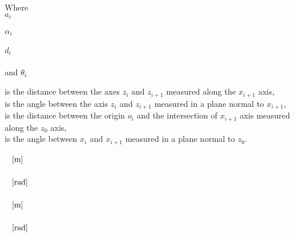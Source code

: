 \begin{minipage}[t]{0.20\textwidth}
Where\\
\hspace*{8mm} $a_i$ \\\\
\hspace*{8mm} $\alpha_i$ \\\\
\hspace*{8mm} $d_i$ \\\\
and \hspace*{0.7mm} $\theta_i$	
\end{minipage}
\begin{minipage}[t]{0.68\textwidth}
\vspace*{2mm}
is the distance between the axes $z_i$ and $z_{i+1}$ measured along the $x_{i+1}$ axis,\\
is the angle between the axis $z_i$ and $z_{i+1}$ measured in a plane normal to $x_{i+1}$,\\
is the distance between the origin $o_i$ and the intersection of $x_{i+1}$ axis measured along the $z_0$ axis,\\
is the angle between $x_i$ and $x_{i+1}$ measured in a plane normal to $z_0$.
\end{minipage}
\begin{minipage}[t]{0.10\textwidth}
\vspace*{2mm}
\textcolor{White}{te}$\enhed{m}$\\\\
\textcolor{White}{te}$\enhed{rad}$\\\\
\textcolor{White}{te}$\enhed{m}$\\\\
\textcolor{White}{te}$\enhed{rad}$
\end{minipage}







%

